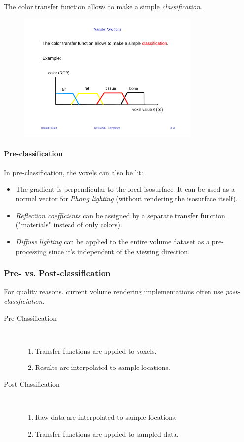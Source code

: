 The color transfer function allows to make a simple \emph{classification}.
\begin{figure}[H]
    \centering
    \includegraphics[width=0.8\textwidth,page=1]{img/03_tf_color}
\end{figure}

\paragraph{Pre-classification} In pre-classification, the voxels can also be lit:
\begin{itemize}
    \item The gradient is perpendicular to the local isosurface. It can be used as a normal vector for \emph{Phong lighting} (without rendering the isosurface itself).
    \item \emph{Reflection coefficients} can be assigned by a separate transfer function ("materials" instead of only colors).
    \item \emph{Diffuse lighting} can be applied to the entire volume dataset as a pre-processing since it's independent of the viewing direction.
\end{itemize}

\subsubsection{Pre- vs. Post-classification}
For quality reasons, current volume rendering implementations often use \emph{post-classficiation}.

\begin{description}
\item[Pre-Classification] $\ $
    \begin{enumerate}
        \item Transfer functions are applied to voxels.
        \item Results are interpolated to sample locations.
    \end{enumerate}
\item[Post-Classification] $\ $
    \begin{enumerate}
        \item Raw data are interpolated to sample locations.
        \item Transfer functions are applied to sampled data.
    \end{enumerate}
\end{description}

